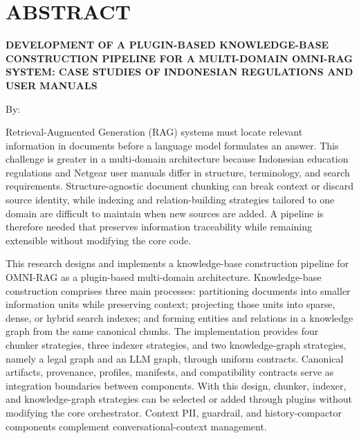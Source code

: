 \clearpage
\chapter*{ABSTRACT}

\begin{center}
    \begin{singlespace}
        {\large\bfseries DEVELOPMENT OF A PLUGIN-BASED KNOWLEDGE-BASE CONSTRUCTION PIPELINE FOR A MULTI-DOMAIN OMNI-RAG SYSTEM: CASE STUDIES OF INDONESIAN REGULATIONS AND USER MANUALS}

        {\normalfont\normalsize By:}

        {\bfseries \AuthorName}
    \end{singlespace}
\end{center}

\begin{singlespace}
    \small

    Retrieval-Augmented Generation (RAG) systems must locate relevant information in documents before a language model formulates an answer. This challenge is greater in a multi-domain architecture because Indonesian education regulations and Netgear user manuals differ in structure, terminology, and search requirements. Structure-agnostic document chunking can break context or discard source identity, while indexing and relation-building strategies tailored to one domain are difficult to maintain when new sources are added. A pipeline is therefore needed that preserves information traceability while remaining extensible without modifying the core code.

    This research designs and implements a knowledge-base construction pipeline for OMNI-RAG as a plugin-based multi-domain architecture. Knowledge-base construction comprises three main processes: partitioning documents into smaller information units while preserving context; projecting those units into sparse, dense, or hybrid search indexes; and forming entities and relations in a knowledge graph from the same canonical chunks. The implementation provides four chunker strategies, three indexer strategies, and two knowledge-graph strategies, namely a legal graph and an LLM graph, through uniform contracts. Canonical artifacts, provenance, profiles, manifests, and compatibility contracts serve as integration boundaries between components. With this design, chunker, indexer, and knowledge-graph strategies can be selected or added through plugins without modifying the core orchestrator. Context PII, guardrail, and history-compactor components complement conversational-context management.


\end{singlespace}
